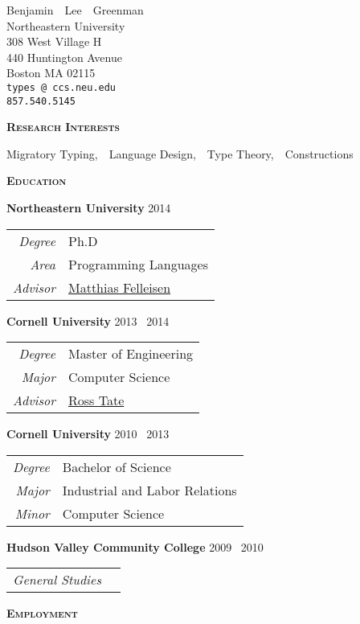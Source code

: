 \documentclass{article}
\makeatletter
\renewcommand{\maketitle}{
\begin{center}
  {\large{Benjamin~~Lee~~Greenman}}
\vspace{0.1cm}
\\Northeastern University
\\308 West Village H
\\440 Huntington Avenue
\\Boston MA 02115
\\\texttt{\fontseries{m}types\,@\,ccs.neu.edu}
\\\texttt{\fontseries{m}857.540.5145}
\end{center}
}
\newcommand{\mysection}[1]{\vspace{0.5cm}
\hspace{-1.3cm}\textsc{\textbf{#1}}~\hrulefill}
\newcommand{\mysubsection}[1]{\hspace{-0.7cm}\textbf{#1}}
\makeatother
\begin{document}
\maketitle


\mysection{Research Interests}

Migratory Typing,~~Language Design,~~Type Theory,~~Constructions

\mysection{Education}

\mysubsection{Northeastern University} \hfill 2014 \textendash\ \hphantom{2018}\\
\begin{tabular}{>{\it}r l}
Degree & Ph.D \\
Area & Programming Languages \\
Advisor & \href{http://ccs.neu.edu/home/matthias}{Matthias Felleisen}
\end{tabular}

\mysubsection{Cornell University} \hfill 2013 \textendash\ 2014\\
\begin{tabular}{>{\it}r l}
Degree & Master of Engineering\\
Major & Computer Science\\
Advisor & \href{http://www.cs.cornell.edu/~ross/}{Ross Tate}
\end{tabular}

\mysubsection{Cornell University} \hfill 2010 \textendash\ 2013\\
\begin{tabular}{>{\it}r l}
Degree & Bachelor of Science\\
Major & Industrial and Labor Relations\\
Minor & Computer Science\\
\end{tabular}

\mysubsection{Hudson Valley Community College} \hfill 2009 \textendash\ 2010 \\ 
\begin{tabular}{>{\it}r l}
General Studies & \\
\end{tabular}

\mysection{Employment}
\end{document}
